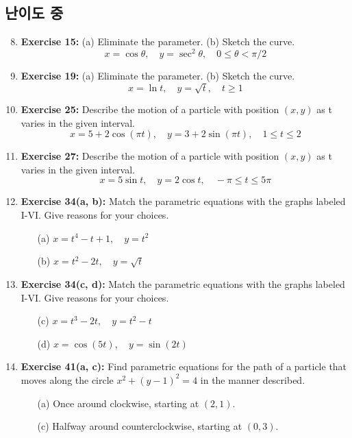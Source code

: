 \documentclass[12pt, a4paper]{article}
\begin{document}
\subsection*{난이도 중 }
\begin{enumerate}
    \setcounter{enumi}{7} %
    \item \textbf{Exercise 15:} (a) Eliminate the parameter. (b) Sketch the curve.
    \[ x = \cos\theta, \quad y = \sec^2\theta, \quad 0 \le \theta < \pi/2 \]

    \item \textbf{Exercise 19:} (a) Eliminate the parameter. (b) Sketch the curve.
    \[ x = \ln t, \quad y = \sqrt{t}, \quad t \ge 1 \]

    \item \textbf{Exercise 25:} Describe the motion of a particle with position $(x,y)$ as t varies in the given interval.
    \[ x = 5 + 2\cos(\pi t), \quad y = 3 + 2\sin(\pi t), \quad 1 \le t \le 2 \]

    \item \textbf{Exercise 27:} Describe the motion of a particle with position $(x,y)$ as t varies in the given interval.
    \[ x = 5\sin t, \quad y = 2\cos t, \quad -\pi \le t \le 5\pi \]

    \item \textbf{Exercise 34(a, b):} Match the parametric equations with the graphs labeled I-VI. Give reasons for your choices.
    \begin{itemize}
        \item[(a)] $x = t^4 - t + 1, \quad y = t^2$
        \item[(b)] $x = t^2 - 2t, \quad y = \sqrt{t}$
    \end{itemize}

    \item \textbf{Exercise 34(c, d):} Match the parametric equations with the graphs labeled I-VI. Give reasons for your choices.
    \begin{itemize}
        \item[(c)] $x = t^3 - 2t, \quad y = t^2 - t$
        \item[(d)] $x = \cos(5t), \quad y = \sin(2t)$
    \end{itemize}

    \item \textbf{Exercise 41(a, c):} Find parametric equations for the path of a particle that moves along the circle $x^2 + (y-1)^2 = 4$ in the manner described.
    \begin{itemize}
        \item[(a)] Once around clockwise, starting at $(2, 1)$.
        \item[(c)] Halfway around counterclockwise, starting at $(0, 3)$.
    \end{itemize}


\end{enumerate}
\end{document}
